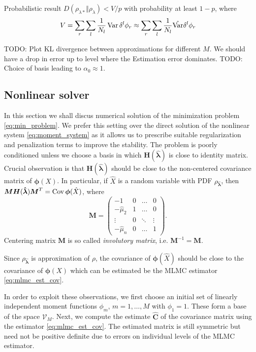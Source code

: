 \documentclass{article}
\def\vc#1{\mathbf{\boldsymbol{#1}}}     %
\def\tn#1{\boldsymbol{#1}}
\def\todo#1{{\color{red}TODO: #1}}
\def\Var{\mathop{\rm Var}}
\def\Cov{\mathop{\rm Cov}}
\def\estvl{{\vc{\hat\lambda}}}
\def\vphi{\vc\phi}
\begin{document}
Probabilistic result $D(\rho_{\lambda*} \Vert \rho_{\lambda}) < V/p$
with probability at least $1-p$, where 
\[
    V = \sum_r \sum_l \frac{1}{N_l} \Var \delta^l\phi_r \approx \sum_r \sum_l \frac{1}{N_l} \hat{\Var} \delta^l\phi_r 
\]

\todo{Plot KL divergence between approximations for different $M$. We should have a drop in error up to level where the Estimation error dominates.}
\todo{Choice of basis leading to $\alpha_0 \approx 1$.}

\subsection{Nonlinear solver}\label{nonlinear_solver}

In this section we shall discus numerical solution of the minimization problem \eqref{eq:min_problem}. We prefer this setting over the direct solution of the nonlinear system \eqref{eq:moment_system} as it allows us to prescribe suitable regularization and penalization terms to improve the stability.
The problem is poorly conditioned unless we choose a basis in which $\tn H(\estvl)$ is close to identity matrix. Crucial observation is that $\tn H(\estvl)$ should be close to the non-centered 
covariance matrix of  $\vphi(X)$. In particular, if $\hat X$ is a random variable with PDF $\rho_{\estvl}$, then $\tn M \tn H(\estvl) \tn M^T = \Cov \vphi(\hat X)$, where 
\[
  \tn M = 
  \begin{pmatrix}
    -1    & 0 &\dots &0\\
    -\hat\mu_2    & 1 &\dots &0\\
    \vdots& 0 &\ddots      &\vdots\\
    -\hat\mu_n    & 0 &\dots &1
  \end{pmatrix}.
\]
Centering matrix $\tn M$ is so called \emph{involutory matrix}, i.e. $\tn M^{-1} = \tn M$.


Since $\rho_{\estvl}$ is approximation of $\rho$, the covariance of $\vphi(\hat X)$ should be close to the covariance of $\vphi(X)$ which can be estimated be the MLMC estimator \eqref{eq:mlmc_est_cov}.

In order to exploit these observations, we first choose an initial set of linearly independent 
moment functions $\phi_m$, $m=1,\dots,M$ with $\phi_1=1$. These form a base of the space $\mathcal V_M$.
Next, we compute the estimate $\hat{\tn C}$ of the covariance matrix using the estimator \eqref{eq:mlmc_est_cov}. The estimated matrix is still symmetric but need not be positive definite
due to errors on individual levels of the MLMC estimator. 
\end{document}
